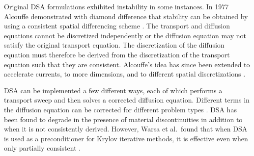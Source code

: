 
Original DSA formulations exhibited instability in some instances. In 1977 Alcouffe demonstrated with diamond difference that stability can be obtained by using a consistent spatial differencing scheme \cite{Alcouffe1977}. The transport and diffusion equations cannot be discretized independently or the diffusion equation may not satisfy the original transport equation. The discretization of the diffusion equation must therefore be derived from the discretization of the transport equation such that they are consistent. Alcouffe's idea has since been extended to accelerate currents, to more dimensions, and to different spatial discretizations \cite{Larsen1982}. 

DSA can be implemented a few different ways, each of which performs a transport sweep and then solves a corrected diffusion equation. Different terms in the diffusion equation can be corrected for different problem types \cite{Alcouffe1977}. DSA has been found to degrade in the presence of material discontinuities in addition to when it is not consistently derived. However, Warsa et al.\ found that when DSA is used as a preconditioner for Krylov iterative methods, it is effective even when only partially consistent \cite{Warsa2004}.

